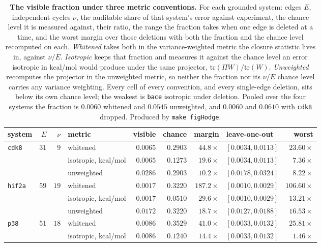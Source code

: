 \begin{table}[tp]\centering
\caption{\textbf{The visible fraction under three metric conventions.} For each grounded system: edges $E$, independent cycles $\nu$, the auditable share of that system's error against experiment, the chance level it is measured against, their ratio, the range the fraction takes when one edge is deleted at a time, and the worst margin over those deletions with both the fraction and the chance level recomputed on each. \emph{Whitened} takes both in the variance-weighted metric the closure statistic lives in, against $\nu/E$. \emph{Isotropic} keeps that fraction and measures it against the chance level an error isotropic in kcal/mol would produce under the same projector, $\mathrm{tr}(\Pi W)/\mathrm{tr}(W)$. \emph{Unweighted} recomputes the projector in the unweighted metric, so neither the fraction nor its $\nu/E$ chance level carries any variance weighting. Every cell of every convention, and every single-edge deletion, sits below its own chance level; the weakest is \texttt{bace} isotropic under deletion. Pooled over the four systems the fraction is $0.0060$ whitened and $0.0545$ unweighted, and $0.0060$ and $0.0610$ with \texttt{cdk8} dropped. Produced by \texttt{make figHodge}.}
\label{tab:metrics}
\small
\begin{tabular}{@{}lrrlrrrlr@{}}
\toprule
system & $E$ & $\nu$ & metric & visible & chance & margin & leave-one-out & worst \\
\midrule
\texttt{cdk8} & $31$ & $9$ & whitened & $0.0065$ & $0.2903$ & $44.8\times$ & $[0.0034,0.0113]$ & $23.60\times$ \\
& & & isotropic, kcal/mol & $0.0065$ & $0.1273$ & $19.6\times$ & $[0.0034,0.0113]$ & $7.36\times$ \\
& & & unweighted & $0.0286$ & $0.2903$ & $10.2\times$ & $[0.0178,0.0324]$ & $8.22\times$ \\
\addlinespace[2pt]
\texttt{hif2a} & $59$ & $19$ & whitened & $0.0017$ & $0.3220$ & $187.2\times$ & $[0.0010,0.0029]$ & $106.60\times$ \\
& & & isotropic, kcal/mol & $0.0017$ & $0.0510$ & $29.6\times$ & $[0.0010,0.0029]$ & $13.21\times$ \\
& & & unweighted & $0.0172$ & $0.3220$ & $18.7\times$ & $[0.0127,0.0188]$ & $16.53\times$ \\
\addlinespace[2pt]
\texttt{p38} & $51$ & $18$ & whitened & $0.0086$ & $0.3529$ & $41.0\times$ & $[0.0033,0.0132]$ & $25.81\times$ \\
& & & isotropic, kcal/mol & $0.0086$ & $0.1240$ & $14.4\times$ & $[0.0033,0.0132]$ & $1.46\times$ \\

\end{tabular}
\end{table}
